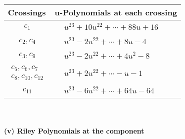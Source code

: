 \documentclass[1p]{elsarticle_modified}
\theoremstyle{definition}
\begin{document}
\begin{tabular}{m{50pt}|m{274pt}}
Crossings & \hspace{64pt}u-Polynomials at each crossing \\
\hline $$\begin{aligned}c_{1}\end{aligned}$$&$\begin{aligned}
&u^{23}+10 u^{22}+\cdots+88 u+16
\end{aligned}$\\
\hline $$\begin{aligned}c_{2},c_{4}\end{aligned}$$&$\begin{aligned}
&u^{23}-2 u^{22}+\cdots+8 u-4
\end{aligned}$\\
\hline $$\begin{aligned}c_{3},c_{9}\end{aligned}$$&$\begin{aligned}
&u^{23}-2 u^{22}+\cdots+4 u^2-8
\end{aligned}$\\
\hline $$\begin{aligned}c_{5},c_{6},c_{7}\\c_{8},c_{10},c_{12}\end{aligned}$$&$\begin{aligned}
&u^{23}+2 u^{22}+\cdots- u-1
\end{aligned}$\\
\hline $$\begin{aligned}c_{11}\end{aligned}$$&$\begin{aligned}
&u^{23}-6 u^{22}+\cdots+64 u-64
\end{aligned}$\\
\hline
\end{tabular}\\~\\
\newpage\renewcommand{\arraystretch}{1}
\flushleft \textbf{(v) Riley Polynomials at the component}\newline \\
\end{document}
